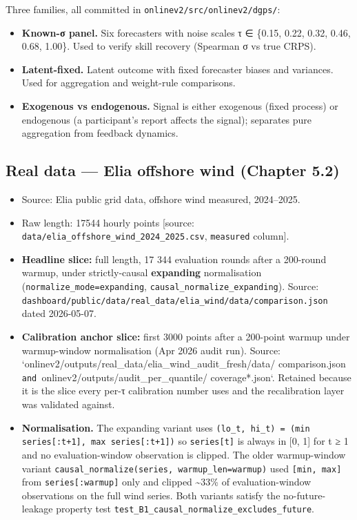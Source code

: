 \documentclass[11pt,a4paper,openany]{report}
\begin{document}
Three families, all committed in \texttt{onlinev2/src/onlinev2/dgps/}:

\begin{itemize}
  \item \textbf{Known-σ panel.} Six forecasters with noise scales τ ∈
    \{0.15, 0.22, 0.32, 0.46, 0.68, 1.00\}. Used to verify skill recovery
    (Spearman σ vs true CRPS).
  \item \textbf{Latent-fixed.} Latent outcome with fixed forecaster biases and
    variances. Used for aggregation and weight-rule comparisons.
  \item \textbf{Exogenous vs endogenous.} Signal is either exogenous (fixed
    process) or endogenous (a participant's report affects the signal);
    separates pure aggregation from feedback dynamics.
\end{itemize}

\subsection{Real data — Elia offshore wind (Chapter 5.2)}

\begin{itemize}
  \item Source: Elia public grid data, offshore wind measured, 2024–2025.
  \item Raw length: 17544 hourly points
    [source: \texttt{data/elia\_offshore\_wind\_2024\_2025.csv}, \texttt{measured} column].
  \item \textbf{Headline slice:} full length, 17 344 evaluation rounds after a
    200-round warmup, under strictly-causal \textbf{expanding} normalisation
    (\texttt{normalize\_mode=expanding}, \texttt{causal\_normalize\_expanding}). Source:
    \texttt{dashboard/public/data/real\_data/elia\_wind/data/comparison.json}
    dated 2026-05-07.
  \item \textbf{Calibration anchor slice:} first 3000 points after a 200-point
    warmup under warmup-window normalisation (Apr 2026 audit run).
    Source: `onlinev2/outputs/real\_data/elia\_wind\_audit\_fresh/data/
    comparison.json\texttt{ and }onlinev2/outputs/audit\_per\_quantile/
    coverage*.json`. Retained because it is the slice every per-τ
    calibration number uses and the recalibration layer was validated
    against.
  \item \textbf{Normalisation.} The expanding variant uses
    \texttt{(lo\_t, hi\_t) = (min series[:t+1], max series[:t+1])} so
    \texttt{series[t]} is always in [0, 1] for t ≥ 1 and no evaluation-window
    observation is clipped. The older warmup-window variant
    \texttt{causal\_normalize(series, warmup\_len=warmup)} used \texttt{[min, max]} from
    \texttt{series[:warmup]} only and clipped \textasciitilde{}33\% of evaluation-window
    observations on the full wind series. Both variants satisfy the
    no-future-leakage property test
    \texttt{test\_B1\_causal\_normalize\_excludes\_future}.
\end{itemize}
\end{document}
